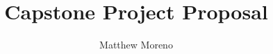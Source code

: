 \documentclass[a4paper]{article}
\title{Capstone Project Proposal}
\author{Matthew Moreno}
\begin{document}
\maketitle


\doublespacing















 \newpage
 

 \newpage
 
 
\end{document}
